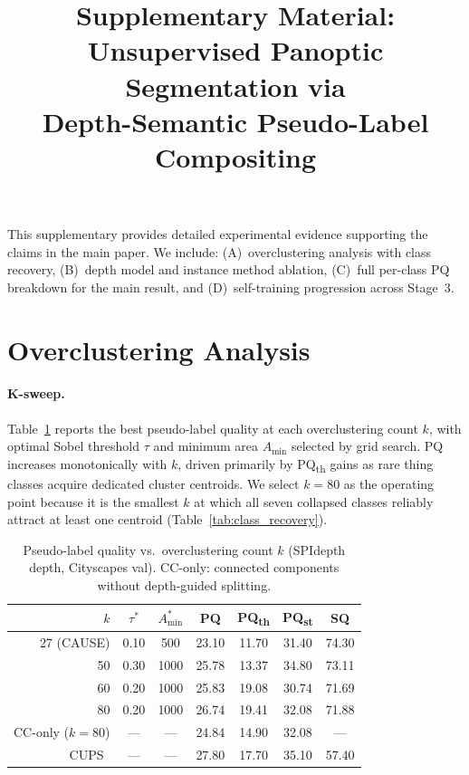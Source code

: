 \documentclass{bmvc2k}
\title{Supplementary Material:\\Unsupervised Panoptic Segmentation via\\Depth-Semantic Pseudo-Label Compositing}
\newcommand{\pqt}{PQ\textsubscript{th}\xspace}
\newcommand{\pqs}{PQ\textsubscript{st}\xspace}
\begin{document}
\maketitle

This supplementary provides detailed experimental evidence supporting the claims in the main paper. We include: (A)~overclustering analysis with class recovery, (B)~depth model and instance method ablation, (C)~full per-class PQ breakdown for the main result, and (D)~self-training progression across Stage~3.

\appendix
\section{Overclustering Analysis}
\label{app:overclustering}

\paragraph{K-sweep.}
Table~\ref{tab:ksweep} reports the best pseudo-label quality at each overclustering count $k$, with optimal Sobel threshold $\tau$ and minimum area $A_\text{min}$ selected by grid search. PQ increases monotonically with $k$, driven primarily by \pqt gains as rare thing classes acquire dedicated cluster centroids. We select $k{=}80$ as the operating point because it is the smallest $k$ at which all seven collapsed classes reliably attract at least one centroid (Table~\ref{tab:class_recovery}).

\begin{table}[h]
\centering
\caption{Pseudo-label quality vs.\ overclustering count $k$ (SPIdepth depth, Cityscapes val). CC-only: connected components without depth-guided splitting.}
\label{tab:ksweep}
\small
\begin{tabular}{@{}rcccccc@{}}
\toprule
$k$ & $\tau^*$ & $A_\text{min}^*$ & PQ & \pqt & \pqs & SQ \\
\midrule
27 (CAUSE) & 0.10 & 500 & 23.10 & 11.70 & 31.40 & 74.30 \\
50 & 0.30 & 1000 & 25.78 & 13.37 & 34.80 & 73.11 \\
60 & 0.20 & 1000 & 25.83 & 19.08 & 30.74 & 71.69 \\
80 & 0.20 & 1000 & 26.74 & 19.41 & 32.08 & 71.88 \\
\midrule
CC-only ($k{=}80$) & --- & --- & 24.84 & 14.90 & 32.08 & --- \\
CUPS~\cite{hahn2025cups} & --- & --- & 27.80 & 17.70 & 35.10 & 57.40 \\
\bottomrule
\end{tabular}
\end{table}
\end{document}
